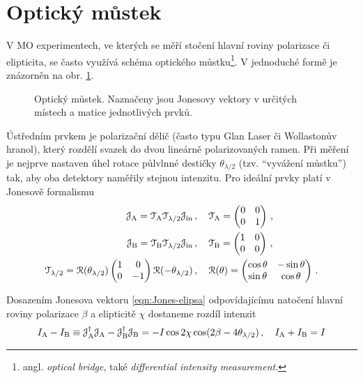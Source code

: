 \section{Optický můstek}
\label{chap:mustek-kap2}
V MO experimentech, ve kterých se měří stočení hlavní roviny polarizace či elipticita, se často využívá schéma optického můstku\footnote{angl. \emph{optical bridge}, také \emph{differential intensity measurement}.}\cite{silberQuadraticMagnetoopticKerr2019a}.
V jednoduché formě je znázorněn na obr. \ref{fig:mustek-schema}.

\begin{figure}[htbp]
    \centering
    
    \caption{Optický můstek. Naznačeny jsou Jonesovy vektory v určitých místech a matice jednotlivých prvků.}
    \label{fig:mustek-schema}
\end{figure}

Ústředním prvkem je polarizační dělič (často typu Glan Laser či Wollastonův hranol), který rozdělí svazek do dvou lineárně polarizovaných ramen.
Při měření je nejprve nastaven úhel rotace půlvlnné destičky $\theta_{\lambda/2}$ (tzv. ``vyvážení můstku'') tak, aby oba detektory naměřily stejnou intenzitu.
Pro ideální prvky platí v Jonesově formalismu
\begin{align}
    \mathcal{J}_\textrm{A} = \mathcal{T}_\textrm{A} \mathcal{T}_{\lambda/2} \mathcal{J}_\textrm{in} \,&, \quad 
    \mathcal{T}_\textrm{A}=\begin{pmatrix} 0&0\\0&1 \end{pmatrix} \,, \\
    \mathcal{J}_\textrm{B} = \mathcal{T}_\textrm{B} \mathcal{T}_{\lambda/2} \mathcal{J}_\textrm{in} \,&, \quad
    \mathcal{T}_\textrm{B}=\begin{pmatrix} 1&0\\0&0 \end{pmatrix} \,,\\
    \mathcal{T}_{\lambda/2}=\mathcal{R}(\theta_{\lambda/2})\begin{pmatrix} 1&0\\0&-1 \end{pmatrix}\mathcal{R}(-\theta_{\lambda/2}) \,&, \quad
    \mathcal{R}(\theta)=\begin{pmatrix} \cos\theta&-\sin\theta\\\sin\theta&\cos\theta \end{pmatrix} \,.
\end{align}

Dosazením Jonesova vektoru \eqref{eqn:Jones-elipsa} odpovídajícímu natočení hlavní roviny polarizace $\beta$ a elipticitě $\chi$ dostaneme rozdíl intenzit
\begin{equation}
    I_\textrm{A}-I_\textrm{B}\equiv\mathcal{J}_\textrm{A}^\dagger\mathcal{J}_\textrm{A}-\mathcal{J}_\textrm{B}^\dagger\mathcal{J}_\textrm{B}=-I\cos2\chi \cos(2\beta-4\theta_{\lambda/2}) \,, \quad I_\textrm{A}+I_\textrm{B}=I
\end{equation}

